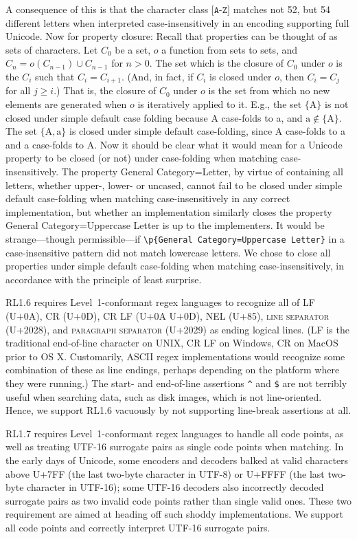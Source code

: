 \documentclass[5p,final,number,sort&compress]{elsarticle}
\newcommand{\re}[1]{\texttt{#1}}
\newcommand*{\whack}{\textbackslash}
\begin{document}
A consequence of this is that the character class $\re{[A-Z]}$ matches not 52, but 54 different letters when interpreted case-insensitively in an encoding supporting full Unicode. Now for property closure: Recall that properties can be thought of as sets of characters. Let $C_0$ be a set, $o$ a function from sets to sets, and $C_n = o(C_{n-1}) \cup C_{n-1}$ for $n > 0$. The set which is the closure of $C_0$ under $o$ is the $C_i$ such that $C_i = C_{i+1}$. (And, in fact, if $C_i$ is closed under $o$, then $C_i = C_j$ for all $j \ge i$.) That is, the closure of $C_0$ under $o$ is the set from which no new elements are generated when $o$ is iteratively applied to it. E.g., the set $\{\mathrm{A}\}$ is not closed under simple default case folding because A case-folds to a, and $\mathrm{a} \notin \{\mathrm{A}\}$. The set $\{\mathrm{A}, \mathrm{a}\}$ is closed under simple default case-folding, since A case-folds to a and a case-folds to A. Now it should be clear what it would mean for a Unicode property to be closed (or not) under case-folding when matching case-insensitively. The property General Category=Letter, by virtue of containing all letters, whether upper-, lower- or uncased, cannot fail to be closed under simple default case-folding when matching case-insensitively in any correct implementation, but whether an implementation similarly closes the property General Category=Uppercase Letter is up to the implementers. It would be strange---though permissible---if \re{\whack p\{General Category=Uppercase Letter\}} in a case-insensitive pattern did not match lowercase letters. We chose to close all properties under simple default case-folding when matching case-insensitively, in accordance with the principle of least surprise.

RL1.6 requires Level~1-conformant regex languages to recognize all of LF (U+0A), CR (U+0D), CR LF (U+0A U+0D), NEL (U+85), \textsc{line separator} (U+2028), and \textsc{paragraph separator} (U+2029) as ending logical lines. (LF is the traditional end-of-line character on UNIX, CR LF on Windows, CR on MacOS prior to OS X. Customarily, ASCII regex implementations would recognize some combination of these as line endings, perhaps depending on the platform where they were running.) The start- and end-of-line assertions \re{\^} and \re{\$} are not terribly useful when searching data, such as disk images, which is not line-oriented. Hence, we support RL1.6 vacuously by not supporting line-break assertions at all.

RL1.7 requires Level~1-conformant regex languages to handle all code points, as well as treating UTF-16 surrogate pairs as single code points when matching. In the early days of Unicode, some encoders and decoders balked at valid characters above U+7FF (the last two-byte character in UTF-8) or U+FFFF (the last two-byte character in UTF-16); some UTF-16 decoders also incorrectly decoded surrogate pairs as two invalid code points rather than single valid ones. These two requirement are aimed at heading off such shoddy implementations. We support all code points and correctly interpret UTF-16 surrogate pairs. 
\end{document}
